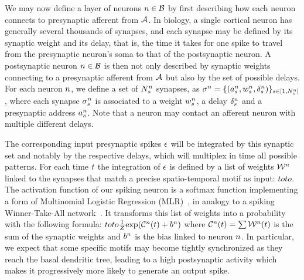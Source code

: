 \documentclass[default]{sn-jnl}%
\theoremstyle{thmstyleone}%
\theoremstyle{thmstyletwo}%
\theoremstyle{thmstylethree}%
\begin{document}
We may now define a layer of neurons $n \in \mathcal{B}$ by first describing how each neuron connects to presynaptic afferent from $\mathcal{A}$. In biology, a single cortical neuron has generally several thousands of synapses, and each synapse may be defined by its synaptic weight and its delay, that is, the time it takes for one spike to travel from the presynaptic neuron's soma to that of the postsynaptic neuron. A postsynaptic neuron $n \in \mathcal{B}$ is then not only described by synaptic weights connecting to a presynaptic afferent from $\mathcal{A}$ but also by the set of possible delays. For each neuron $n$, we define a set of $N_{s}^n$ synapses, as  $\sigma^n = \{(a^n_s, w^n_s, \delta^n_s)\}_{s \in [1,N_{s}^n]}$, where each synapse $\sigma^n_s$ is associated to a weight $w^n_s$, a delay $\delta^n_s$ and a presynaptic address $a^n_s$. Note that a neuron may contact an afferent neuron with multiple different delays.

The corresponding input presynaptic spikes $\epsilon$ will be integrated by this synaptic set and notably by the respective delays, which will multiplex in time all possible patterns.
For each time $t$ the integration of $\epsilon$ is defined by a list of weights $\mathcal{W}^n$ linked to the synapses that match a precise spatio-temporal motif as input:
$
toto
$.
%
The activation function of our spiking neuron is a softmax function implementing a form of  Multinomial Logistic Regression (MLR)~\citep{grimaldi_robust_2022}, in analogy to a spiking Winner-Take-All network~\citep{nessler_bayesian_2013}. It transforms this list of weights into a probability with the following formula:
$
toto
\frac 1 Z
{\exp  (\mathcal{C}^n(t) +b^n) }
$ 
where $\mathcal{C}^n(t) = \sum
\mathcal{W}^n(t)
$ is the sum of the synaptic weights and $b^n$ is the bias linked to neuron $n$. 
In particular, we expect that some specific motifs may become tightly synchronized as they reach the basal dendritic tree, leading to a high postsynaptic activity which makes it progressively more likely to generate an output spike.
%
\end{document}
